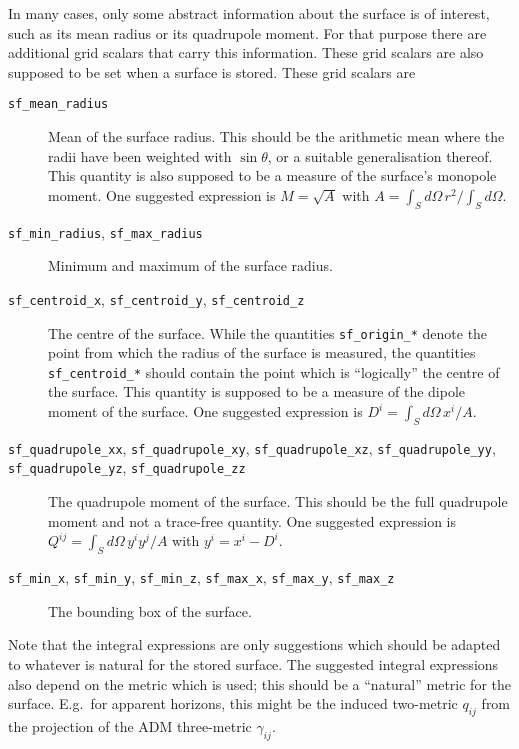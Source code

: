 In many cases, only some abstract information about the surface is of
interest, such as its mean radius or its quadrupole moment.  For that
purpose there are additional grid scalars that carry this information.
These grid scalars are also supposed to be set when a surface is
stored.  These grid scalars are
\begin{description}

\item[\texttt{sf\_mean\_radius}] Mean of the surface radius.  This
should be the arithmetic mean where the radii have been weighted with
$\sin\theta$, or a suitable generalisation thereof.  This quantity is
also supposed to be a measure of the surface's monopole moment.  One
suggested expression is $M=\sqrt{A}$ with $A = \int_S d\Omega\, r^2 /
\int_S d\Omega$.

\item[\texttt{sf\_min\_radius}, \texttt{sf\_max\_radius}] Minimum and
maximum of the surface radius.

\item[\texttt{sf\_centroid\_x}, \texttt{sf\_centroid\_y},
\texttt{sf\_centroid\_z}] The centre of the surface.  While the
quantities \texttt{sf\_origin\_*} denote the point from which the
radius of the surface is measured, the quantities
\texttt{sf\_centroid\_*} should contain the point which is
``logically'' the centre of the surface.  This quantity is supposed to
be a measure of the dipole moment of the surface.  One suggested
expression is $D^i = \int_S d\Omega\, x^i / A$.

\item[\texttt{sf\_quadrupole\_xx}, \texttt{sf\_quadrupole\_xy},
\texttt{sf\_quadrupole\_xz}, \texttt{sf\_quadrupole\_yy},
\texttt{sf\_quadrupole\_yz}, \texttt{sf\_quadrupole\_zz}] The
quadrupole moment of the surface. This should be the full quadrupole
moment and not a trace-free quantity.  One suggested expression is
$Q^{ij} = \int_S d\Omega\, y^i y^j / A$ with $y^i = x^i - D^i$.

\item[\texttt{sf\_min\_x}, \texttt{sf\_min\_y}, \texttt{sf\_min\_z},
\texttt{sf\_max\_x}, \texttt{sf\_max\_y}, \texttt{sf\_max\_z}] The
bounding box of the surface.

\end{description}
Note that the integral expressions are only suggestions which should
be adapted to whatever is natural for the stored surface.  The
suggested integral expressions also depend on the metric which is
used; this should be a ``natural'' metric for the surface.  E.g.\ for
apparent horizons, this might be the induced two-metric $q_{ij}$ from
the projection of the ADM three-metric $\gamma_{ij}$.



